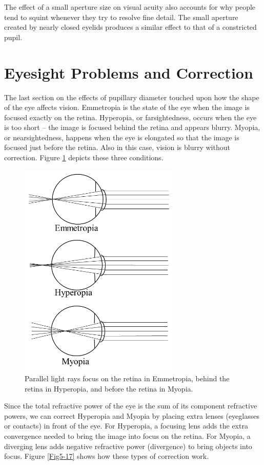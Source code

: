 The effect of a small aperture size on visual acuity also accounts for why people tend to squint whenever they try to resolve fine detail. The small aperture created by nearly closed eyelids produces a similar effect to that of a constricted pupil.   

\section{Eyesight Problems and Correction}

The last section on the effects of pupillary diameter touched upon how the shape of the eye affects vision. Emmetropia is the state of the eye when the image is focused exactly on the retina. Hyperopia, or farsightedness, occurs when the eye is too short -- the image is focused behind the retina and appears blurry.  Myopia, or nearsightedness, happens when the eye is elongated so that the image is focused just before the retina.  Also in this case, vision is blurry without correction.  Figure \ref{Fig5-16} depicts these three conditions.
\begin{figure}[h]
	\centering
	\includegraphics[width=3.0in]{./figures/Topic5/Fig5-16.png}
	\caption{Parallel light rays focus on the retina in Emmetropia, behind the retina in Hyperopia, and before the retina in Myopia.}
	\label{Fig5-16}
\end{figure}
Since the total refractive power of the eye is the sum of its component refractive powers, we can correct Hyperopia and Myopia by placing extra lenses (eyeglasses or contacts) in front of the eye.  For Hyperopia, a focusing lens adds the extra convergence needed to bring the image into focus on the retina.  For Myopia, a diverging lens adds negative refractive power (divergence) to bring objects into focus.  Figure \ref{Fig5-17} shows how these types of correction work.
